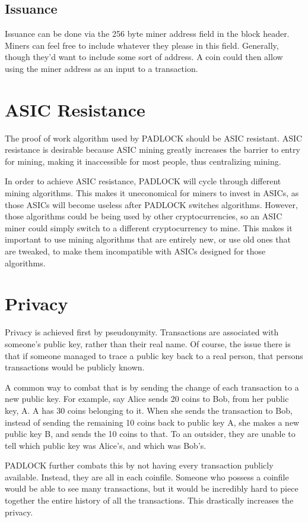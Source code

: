 \documentclass[12pt, letterpaper]{article} \usepackage[utf8]{inputenc}
\begin{document}
\subsection{Issuance} Issuance can be done via the 256 byte miner address field
in the block header. Miners can feel free to include whatever they please in
this field. Generally, though they'd want to include some sort of address. A
coin could then allow using the miner address as an input to a transaction.

\section{ASIC Resistance} The proof of work algorithm used by PADLOCK should be
ASIC resistant. ASIC resistance is desirable because ASIC mining greatly
increases the barrier to entry for mining, making it inaccessible for most
people, thus centralizing mining.

In order to achieve ASIC resistance, PADLOCK will cycle through different
mining algorithms. This makes it uneconomical for miners to invest in ASICs, as
those ASICs will become useless after PADLOCK switches algorithms. However,
those algorithms could be being used by other cryptocurrencies, so an ASIC
miner could simply switch to a different cryptocurrency to mine. This makes it
important to use mining algorithms that are entirely new, or use old ones that
are tweaked, to make them incompatible with ASICs designed for those algorithms.

\section{Privacy} Privacy is achieved first by pseudonymity. Transactions are
associated with someone's public key, rather than their real name. Of course,
the issue there is that if someone managed to trace a public key back to a real
person, that persons transactions would be publicly known.

A common way to combat that is by sending the change of each transaction to a
new public key. For example, say Alice sends 20 coins to Bob, from her public
key, A. A has 30 coins belonging to it. When she sends the transaction to Bob,
instead of sending the remaining 10 coins back to public key A, she makes a new
public key B, and sends the 10 coins to that. To an outsider, they are unable
to tell which public key was Alice's, and which was Bob's.

PADLOCK further combats this by not having every transaction publicly
available. Instead, they are all in each coinfile. Someone who possess a
coinfile would be able to see many transactions, but it would be incredibly
hard to piece together the entire history of all the transactions. This
drastically increases the privacy.
\end{document}
